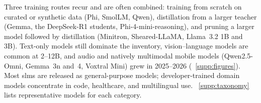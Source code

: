 Three training routes recur and are often combined: training from scratch on curated or synthetic data (Phi, SmolLM, Qwen), distillation from a larger teacher (Gemma, the DeepSeek-R1 students, Phi-4-mini-reasoning), and pruning a larger model followed by distillation (Minitron, Sheared-LLaMA, Llama~3.2 1B and 3B). Text-only models still dominate the inventory, vision--language models are common at 2--12B, and audio and natively multimodal mobile models (Qwen2.5-Omni, Gemma~3n and~4, Voxtral Mini) grew in 2025--2026 (\suppsec~\ref{supp:figures}). Most \glspl{slm} are released as general-purpose models; developer-trained domain models concentrate in code, healthcare, and multilingual use. \suppsec~\ref{supp:taxonomy} lists representative models for each category.
